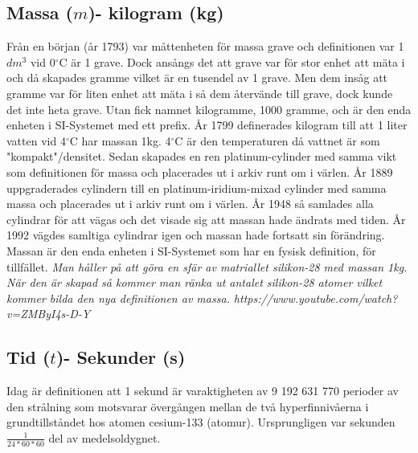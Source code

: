 \documentclass[a4paper,11pt]{article}
\begin{document}
\begin{flushleft}
\subsection{Massa ($m$)- kilogram (kg)}
Från en början (år 1793) var måttenheten för massa grave och definitionen var 1$dm^3$ vid 0$^{\circ}$C är 1 grave.
Dock ansångs det att grave var för stor enhet att mäta i och då skapades gramme vilket är en tusendel av 1 grave.
Men dem insåg att gramme var för liten enhet att mäta i så dem återvände till grave, dock kunde det inte heta grave. 
Utan fick namnet kilogramme, 1000 gramme, och är den enda enheten i SI-Systemet med ett prefix.\newline\newline
År 1799 definerades kilogram till att 1 liter vatten vid 4$^{\circ}$C har massan 1kg. 4$^{\circ}$C är den temperaturen
då vattnet är som "kompakt"/densitet.\newline
Sedan skapades en ren platinum-cylinder med samma vikt som definitionen för massa och placerades ut i arkiv runt om i värlen.\newline\newline
År 1889 uppgraderades cylindern till en platinum-iridium-mixad cylinder med samma massa och placerades ut i arkiv runt om i värlen.\newline\newline
År 1948 så samlades alla cylindrar för att vägas och det visade sig att massan hade ändrats med tiden.\newline\newline
År 1992 vägdes samltiga cylindrar igen och massan hade fortsatt sin förändring.\newline\newline
Massan är den enda enheten i SI-Systemet som har en fysisk definition, för tillfället.\newline
\textit{Man håller på att göra en sfär av matriallet silikon-28 med massan 1kg. När den är skapad så kommer man
ränka ut antalet silikon-28 atomer vilket kommer bilda den nya definitionen av massa. https://www.youtube.com/watch?v=ZMByI4s-D-Y}
\newline
\newline
\subsection{Tid ($t$)- Sekunder (s)}
Idag är definitionen att 1 sekund är varaktigheten av 9 192 631 770 perioder av den strålning som motsvarar övergången mellan de två 
hyperfinnivåerna i grundtillståndet hos atomen cesium-133 (atomur). \newline \newline
Ursprungligen var sekunden $ \frac{1}{24*60*60} $ del av medelsoldygnet.
\newline


\end{flushleft}
\end{document}
